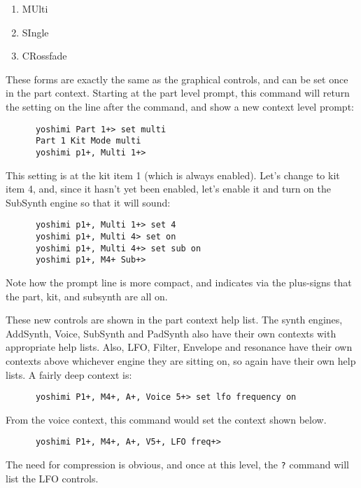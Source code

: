    \begin{enumerate}
      \item MUlti
      \item SIngle
      \item CRossfade
   \end{enumerate}

   These forms are exactly the same as the graphical controls,
   and can be set once in the part context.
   Starting at the part level prompt, this command will return the setting
   on the line after the command, and show a new context level prompt:

   \begin{verbatim}
      yoshimi Part 1+> set multi
      Part 1 Kit Mode multi
      yoshimi p1+, Multi 1+>
   \end{verbatim}

   This setting is at the kit item 1 (which is always enabled).
   Let's change to kit item 4, and, since it hasn't yet been enabled,
   let's enable it and turn on the
   SubSynth engine so that it will sound:

   \begin{verbatim}
      yoshimi p1+, Multi 1+> set 4
      yoshimi p1+, Multi 4> set on
      yoshimi p1+, Multi 4+> set sub on
      yoshimi p1+, M4+ Sub+>
   \end{verbatim}

   Note how the prompt line is more compact, and indicates via the
   plus-signs that the part, kit, and subsynth are all on.

   These new controls are shown in the part context help list.
   The synth engines, AddSynth, Voice, SubSynth and PadSynth also have
   their own contexts with appropriate help lists.
   Also, LFO, Filter, Envelope and resonance have their own contexts
   above whichever engine they are sitting on, so again have their own
   help lists.
   A fairly deep context is:

   \begin{verbatim}
      yoshimi P1+, M4+, A+, Voice 5+> set lfo frequency on
   \end{verbatim}

   From the voice context, this command would set the context shown below.

   \begin{verbatim}
      yoshimi P1+, M4+, A+, V5+, LFO freq+>
   \end{verbatim}

   The need for compression is obvious, and once at this level, the \texttt{?}
   command will list the LFO controls.

